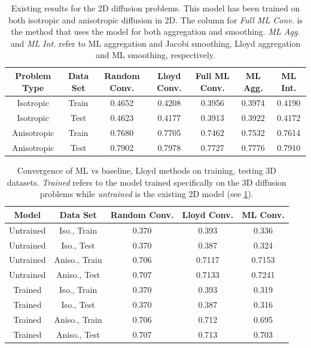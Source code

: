 \documentclass{article}
\begin{document}
\begin{table}[h]
  \centering
  \begin{tabular}{c c c c c c c}
    \textbf{Problem Type} & \textbf{Data Set} & \textbf{Random Conv.} & \textbf{Lloyd Conv.} & \textbf{Full ML Conv.} & \textbf{ML Agg.} & \textbf{ML Int.} \\
    \hline
    Isotropic & Train & 0.4652 & 0.4208 & 0.3956 & 0.3974 & 0.4190 \\
    Isotropic & Test & 0.4623 & 0.4177 & 0.3913 & 0.3922 & 0.4172 \\
    Anisotropic & Train & 0.7680 & 0.7705 & 0.7462 & 0.7532 & 0.7614 \\
    Anisotropic & Test & 0.7902 & 0.7978 & 0.7727 & 0.7776 & 0.7910 \\
    \hline
  \end{tabular}
  \caption{Existing results for the 2D diffusion problems.  This model has been trained on both isotropic and anisotropic diffusion in 2D.  The column for \textit{Full ML Conv.} is the method that uses the model for both aggregation and smoothing.  \textit{ML Agg.} and \textit{ML Int.} refer to ML aggregation and Jacobi smoothing, Lloyd aggregation and ML smoothing, respectively.}
  \label{tab:conv_2d}
\end{table}

\begin{table}[h]
  \centering
  \begin{tabular}{c c c c c}
    \textbf{Model} & \textbf{Data Set} & \textbf{Random Conv.} & \textbf{Lloyd Conv.} & \textbf{ML Conv.} \\
    \hline
    Untrained & Iso., Train & 0.370 & 0.393 & 0.336 \\
    Untrained & Iso., Test & 0.370 & 0.387 & 0.324 \\
    \hline
    Untrained & Aniso., Train & 0.706 & 0.7117 & 0.7153 \\
    Untrained & Aniso., Test & 0.707 & 0.7133 & 0.7241 \\
    \hline
    \hline
    Trained & Iso., Train & 0.370 & 0.393 & 0.319 \\
    Trained & Iso., Test & 0.370 & 0.387 & 0.316 \\
    \hline
    Trained & Aniso., Train & 0.706 & 0.712 & 0.695 \\
    Trained & Aniso., Test & 0.707 & 0.713 & 0.703 \\
    \hline
  \end{tabular}
  \caption{Convergence of ML vs baseline, Lloyd methods on training, testing 3D datasets. \textit{Trained} refers to the model trained specifically on the 3D diffusion problems while \textit{untrained} is the existing 2D model (see \cref{tab:conv_2d}).}
  \label{tab:conv_3d}
\end{table}
\end{document}
